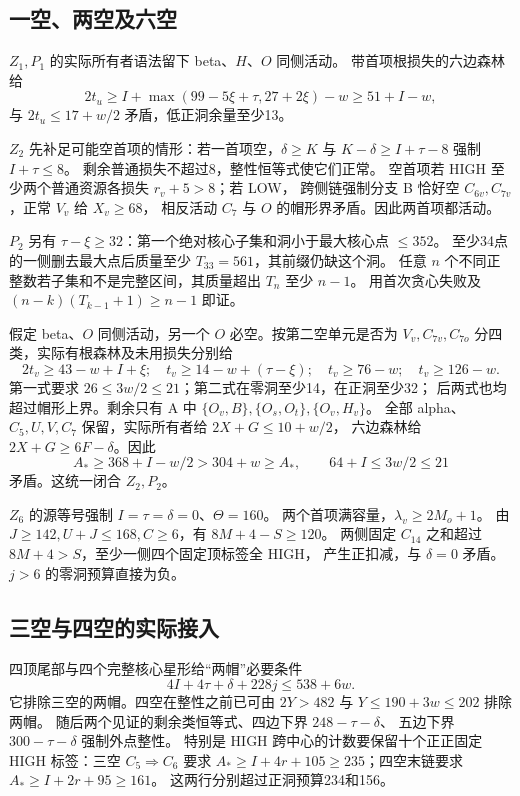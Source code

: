 \documentclass[11pt,a4paper]{article}
\newcommand{\A}{A_*}
\begin{document}
\subsection{一空、两空及六空}
$Z_1,P_1$ 的实际所有者语法留下 beta、$H$、$O$ 同侧活动。
带首项根损失的六边森林给
\[
 2t_u\ge I+\max(99-5\xi+\tau,27+2\xi)-w\ge51+I-w,
\]
与 $2t_u\le17+w/2$ 矛盾，低正洞余量至少13。

$Z_2$ 先补足可能空首项的情形：若一首项空，$\delta\ge K$ 与
$K-\delta\ge I+\tau-8$ 强制 $I+\tau\le8$。
剩余普通损失不超过8，整性恒等式使它们正常。
空首项若 HIGH 至少两个普通资源各损失 $r_v+5>8$；若 LOW，
跨侧链强制分支 B 恰好空 $C_{6v},C_{7v}$，正常 $V_v$ 给 $X_v\ge68$，
相反活动 $C_7$ 与 $O$ 的帽形界矛盾。因此两首项都活动。

$P_2$ 另有 $\tau-\xi\ge32$：第一个绝对核心子集和洞小于最大核心点 $\le352$。
至少34点的一侧删去最大点后质量至少 $T_{33}=561$，其前缀仍缺这个洞。
任意 $n$ 个不同正整数若子集和不是完整区间，其质量超出 $T_n$ 至少 $n-1$。
用首次贪心失败及 $(n-k)(T_{k-1}+1)\ge n-1$ 即证。

假定 beta、$O$ 同侧活动，另一个 $O$ 必空。按第二空单元是否为 $V_v,C_{7v},C_{7o}$
分四类，实际有根森林及未用损失分别给
\[
 2t_v\ge43-w+I+\xi;\quad
 t_v\ge14-w+(\tau-\xi);\quad t_v\ge76-w;\quad t_v\ge126-w.
\]
第一式要求 $26\le3w/2\le21$；第二式在零洞至少14，在正洞至少32；
后两式也均超过帽形上界。剩余只有 A 中
$\{O_v,B\},\{O_s,O_t\},\{O_v,H_v\}$。
全部 alpha、$C_5,U,V,C_7$ 保留，实际所有者给 $2X+G\le10+w/2$，
六边森林给 $2X+G\ge6F-\delta$。因此
\[
 \A\ge368+I-w/2>304+w\ge\A,
 \qquad64+I\le3w/2\le21
\]
矛盾。这统一闭合 $Z_2,P_2$。

$Z_6$ 的源等号强制 $I=\tau=\delta=0$、$\Theta=160$。
两个首项满容量，$\lambda_v\ge2M_o+1$。
由 $J\ge142,U+J\le168,C\ge6$，有 $8M+4-S\ge120$。
两侧固定 $C_{14}$ 之和超过 $8M+4>S$，至少一侧四个固定顶标签全 HIGH，
产生正扣减，与 $\delta=0$ 矛盾。$j>6$ 的零洞预算直接为负。

\subsection{三空与四空的实际接入}
四顶尾部与四个完整核心星形给“两帽”必要条件
\[
 4I+4\tau+\delta+228j\le538+6w.
\]
它排除三空的两帽。四空在整性之前已可由 $2Y>482$ 与 $Y\le190+3w\le202$ 排除两帽。
随后两个见证的剩余类恒等式、四边下界 $248-\tau-\delta$、
五边下界 $300-\tau-\delta$ 强制外点整性。
特别是 HIGH 跨中心的计数要保留十个正正固定 HIGH 标签：三空 $C_5\Rightarrow C_6$
要求 $\A\ge I+4r+105\ge235$；四空末链要求 $\A\ge I+2r+95\ge161$。
这两行分别超过正洞预算234和156。
\end{document}
